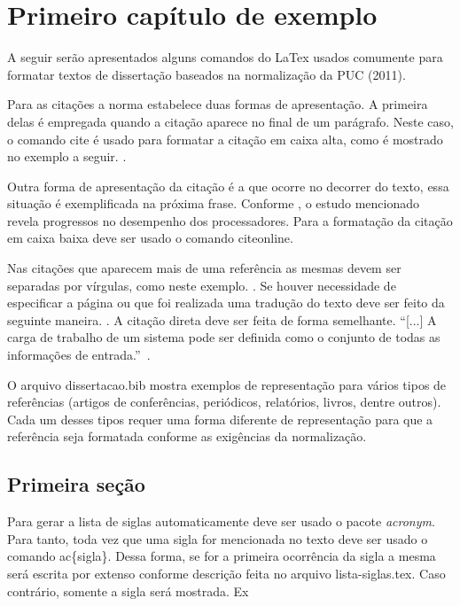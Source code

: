 \chapter{Primeiro capítulo de exemplo}
\label{cap1}

\vspace{-1.9cm}


  A seguir serão apresentados alguns comandos do LaTex usados comumente para formatar textos de dissertação baseados
  na normalização da PUC (2011).

  Para as citações a norma estabelece duas formas de apresentação. A primeira delas é empregada quando a
  citação aparece no final de um parágrafo. Neste caso, o comando cite é usado para formatar a citação em caixa alta,
  como é mostrado no exemplo a seguir. \cite{Duato:2002}.

  Outra forma de apresentação da citação é a que ocorre no decorrer do texto, essa situação é exemplificada na próxima frase.
  Conforme , o estudo mencionado revela progressos no desempenho dos processadores. 
  Para a formatação da citação em caixa baixa deve ser usado o comando citeonline.

  Nas citações que aparecem mais de uma referência as mesmas devem ser separadas por vírgulas, como
  neste exemplo. \cite{Keyes:2008, Zhao:2008, Ganguly:2011}. Se houver necessidade de especificar a página ou que foi
  realizada uma tradução do texto deve ser feito da seguinte maneira. \cite[p.~2, tradução nossa]{Sasaki:2009}.
  A citação direta deve ser feita de forma semelhante. ``[...] A carga de trabalho de um sistema pode 
  ser definida como o conjunto de todas as informações de entrada.''~\cite[p. 160]{Menasce:2002}.

  O arquivo dissertacao.bib mostra exemplos de representação para vários tipos de referências (artigos de conferências, 
  periódicos, relatórios, livros, dentre outros). Cada um desses tipos requer uma forma diferente de representação para 
  que a referência seja formatada conforme as exigências da normalização.

\section{Primeira seção}
\label{secao1}

  Para gerar a lista de siglas automaticamente deve ser usado o pacote \textit{acronym}. Para tanto, toda vez que uma sigla for mencionada no texto
  deve ser usado o comando ac\{sigla\}. Dessa forma, se for a primeira ocorrência da sigla a mesma será escrita por extenso
  conforme descrição feita no arquivo lista-siglas.tex. Caso contrário, somente a sigla será mostrada. Ex

